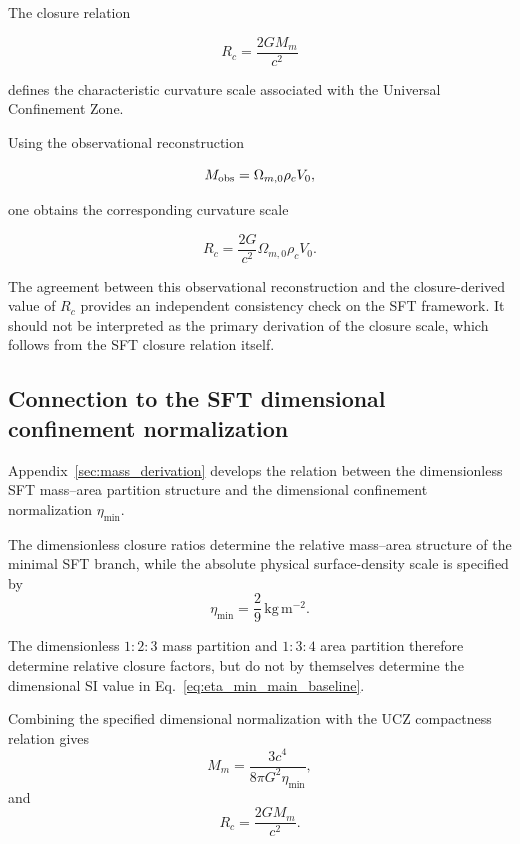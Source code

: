 \documentclass[12pt]{article}
\begin{document}
The closure relation

\begin{equation}
R_c
=
\frac{2GM_m}{c^2}
\end{equation}

defines the characteristic curvature scale associated with the
Universal Confinement Zone.

Using the observational reconstruction

\begin{equation}
M_{\rm obs}
=
\Omega_{m,0}\rho_cV_0,
\end{equation}

one obtains the corresponding curvature scale

\begin{equation}
R_c
=
\frac{2G}{c^2}
\Omega_{m,0}\rho_cV_0.
\end{equation}

The agreement between this observational reconstruction and the
closure-derived value of \(R_c\) provides an independent consistency
check on the SFT framework. It should not be interpreted as the
primary derivation of the closure scale, which follows from the SFT
closure relation itself.


\subsection{Connection to the SFT dimensional confinement normalization}
\label{subsec:sft_dimensional_normalization}

Appendix~\ref{sec:mass_derivation} develops the relation between the
dimensionless SFT mass--area partition structure and the dimensional
confinement normalization $\eta_{\min}$.

The dimensionless closure ratios determine the relative mass--area
structure of the minimal SFT branch, while the absolute physical
surface-density scale is specified by
\begin{equation}
\boxed{
\eta_{\min}
=
\frac{2}{9}\,\mathrm{kg\,m^{-2}}.
}
\label{eq:eta_min_main_baseline}
\end{equation}

The dimensionless $1{:}2{:}3$ mass partition and $1{:}3{:}4$ area
partition therefore determine relative closure factors, but do not by
themselves determine the dimensional SI value in
Eq.~\eqref{eq:eta_min_main_baseline}.

Combining the specified dimensional normalization with the UCZ
compactness relation gives
\begin{equation}
\boxed{
M_m
=
\frac{3c^4}{8\pi G^2\eta_{\min}},
}
\label{eq:Mm_from_baseline_main}
\end{equation}
and
\begin{equation}
\boxed{
R_c
=
\frac{2GM_m}{c^2}.
}
\label{eq:Rc_from_baseline_main}
\end{equation}
\end{document}
